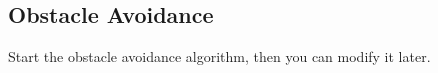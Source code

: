 
\subsection{Obstacle Avoidance}

Start the obstacle avoidance algorithm, then you can modify it later.


\vspace*{6mm}  

